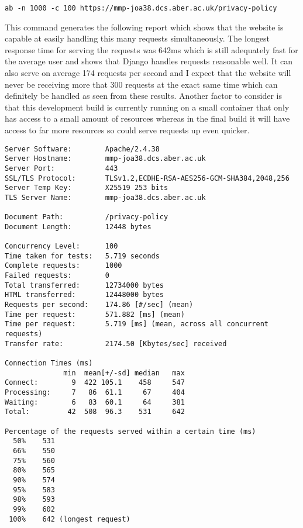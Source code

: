 \verb|ab -n 1000 -c 100 https://mmp-joa38.dcs.aber.ac.uk/privacy-policy|

This command generates the following report which shows that the website is capable at easily handling this many requests simultaneously. The longest response time for serving the requests was 642ms which is still adequately fast for the average user and shows that Django handles requests reasonable well. It can also serve on average 174 requests per second and I expect that the website will never be receiving more that 300 requests at the exact same time which can definitely be handled as seen from these results. Another factor to consider is that this development build is currently running on a small container that only has access to a small amount of resources whereas in the final build it will have access to far more resources so could serve requests up even quicker.

\begin{verbatim}
Server Software:        Apache/2.4.38
Server Hostname:        mmp-joa38.dcs.aber.ac.uk
Server Port:            443
SSL/TLS Protocol:       TLSv1.2,ECDHE-RSA-AES256-GCM-SHA384,2048,256
Server Temp Key:        X25519 253 bits
TLS Server Name:        mmp-joa38.dcs.aber.ac.uk

Document Path:          /privacy-policy
Document Length:        12448 bytes

Concurrency Level:      100
Time taken for tests:   5.719 seconds
Complete requests:      1000
Failed requests:        0
Total transferred:      12734000 bytes
HTML transferred:       12448000 bytes
Requests per second:    174.86 [#/sec] (mean)
Time per request:       571.882 [ms] (mean)
Time per request:       5.719 [ms] (mean, across all concurrent requests)
Transfer rate:          2174.50 [Kbytes/sec] received

Connection Times (ms)
              min  mean[+/-sd] median   max
Connect:        9  422 105.1    458     547
Processing:     7   86  61.1     67     404
Waiting:        6   83  60.1     64     381
Total:         42  508  96.3    531     642

Percentage of the requests served within a certain time (ms)
  50%    531
  66%    550
  75%    560
  80%    565
  90%    574
  95%    583
  98%    593
  99%    602
 100%    642 (longest request)
\end{verbatim}

